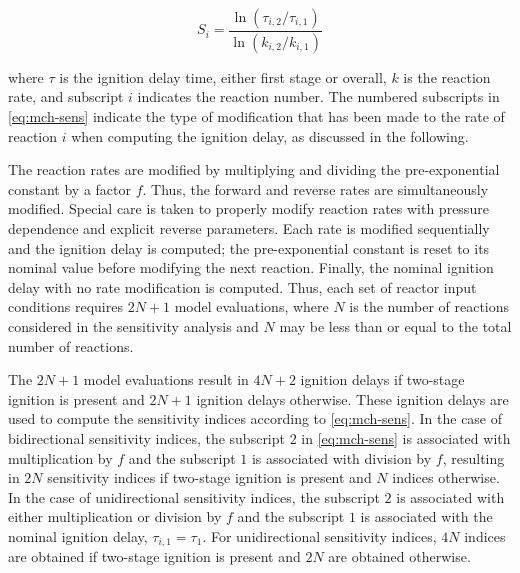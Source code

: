 \documentclass[12pt, letterpaper]{article}
\begin{document}
\begin{equation}
    \label{eq:mch-sens}
    S_i = \frac{\ln\left(\tau_{i,2}/\tau_{i,1}\right)}{\ln\left(k_{i,2}/k_{i,1}\right)}
\end{equation}

where $\tau$ is the ignition delay time, either first stage or overall, $k$ is 
the reaction rate, and subscript $i$ indicates the reaction number. The 
numbered subscripts in \autoref{eq:mch-sens} indicate the type of modification 
that has been made to the rate of reaction $i$ when computing the ignition 
delay, as discussed in the following.

The reaction rates are modified by multiplying and dividing the pre-exponential 
constant by a factor $f$. Thus, the forward and reverse rates are 
simultaneously modified. Special care is taken to properly modify reaction 
rates with pressure dependence and explicit reverse parameters. Each rate is 
modified sequentially and the ignition delay is computed; the pre-exponential 
constant is reset to its nominal value before modifying the next reaction. 
Finally, the nominal ignition delay with no rate modification is computed. 
Thus, each set of reactor input conditions requires $2N+1$ model evaluations, 
where $N$ is the number of reactions considered in the sensitivity analysis 
and $N$ may be less than or equal to the total number of reactions.

The $2N+1$ model evaluations result in $4N+2$ ignition delays if two-stage 
ignition is present and $2N+1$ ignition delays otherwise. These ignition delays 
are used to compute the sensitivity indices according to \autoref{eq:mch-sens}. 
In the case of bidirectional sensitivity indices, the subscript $2$ in 
\autoref{eq:mch-sens} is associated with multiplication by $f$ and the subscript 
$1$ is associated with division by $f$, resulting in $2N$ sensitivity indices if 
two-stage ignition is present and $N$ indices otherwise. In the case of 
unidirectional sensitivity indices, the subscript $2$ is associated with either 
multiplication or division by $f$ and the subscript $1$ is associated with the 
nominal ignition delay, $\tau_{i,1}=\tau_1$. For unidirectional sensitivity 
indices, $4N$ indices are obtained if two-stage ignition is present and $2N$ are 
obtained otherwise.
\end{document}
